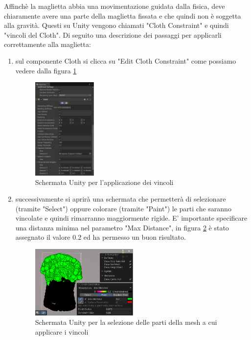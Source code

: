 \documentclass[11pt]{report}
\begin{document}
Affinchè la maglietta abbia una movimentazione guidata dalla fisica, deve chiaramente avere una parte della maglietta fissata e che quindi non è soggetta alla gravità. Questi su Unity vengono chiamati "Cloth Constraint" e quindi "vincoli del Cloth".
Di seguito una descrizione dei passaggi per applicarli correttamente alla maglietta:
\begin{enumerate}
    \item sul componente Cloth si clicca su "Edit Cloth Constraint" come possiamo vedere dalla figura \ref{fig:cloth_constraints}
    \begin{figure}[h!]
        \centering
        \includegraphics[width=0.3\textwidth]{images/cloth_constraints.PNG}
        \caption{Schermata Unity per l'applicazione dei vincoli}
        \label{fig:cloth_constraints}
    \end{figure}
    \item successivamente si aprirà una schermata che permetterà di selezionare (tramite "Select") oppure colorare (tramite "Paint") le parti che saranno vincolate e quindi rimarranno maggiormente rigide. E' importante specificare una distanza minima nel parametro "Max Distance", in figura \ref{fig:cloth_constraints_2} è stato assegnato il valore 0.2 ed ha permesso un buon risultato.
    \begin{figure}[h!]
        \centering
        \includegraphics[width=0.5\textwidth]{images/cloth_constraints_2.PNG}
        \caption{Schermata Unity per la selezione delle parti della mesh a cui applicare i vincoli}
        \label{fig:cloth_constraints_2}
    \end{figure}
\end{enumerate}
\end{document}
